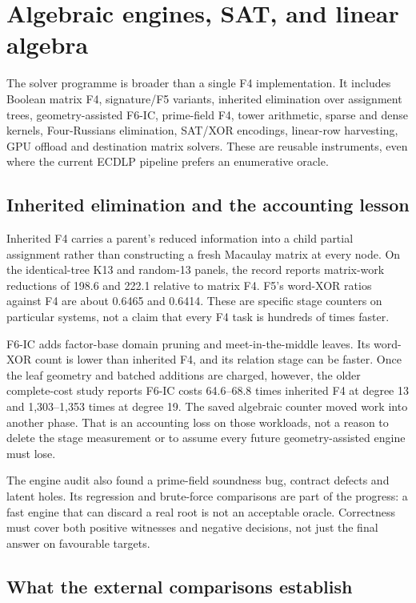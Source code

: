 \section{Algebraic engines, SAT, and linear algebra}\label{sec:solvers}

The solver programme is broader than a single F4 implementation. It
includes Boolean matrix F4, signature/F5 variants, inherited elimination
over assignment trees, geometry-assisted F6-IC, prime-field F4, tower
arithmetic, sparse and dense kernels, Four-Russians elimination, SAT/XOR
encodings, linear-row harvesting, GPU offload and destination matrix
solvers. These are reusable instruments, even where the current ECDLP
pipeline prefers an enumerative oracle.

\subsection{Inherited elimination and the accounting lesson}

Inherited F4 carries a parent's reduced information into a child partial
assignment rather than constructing a fresh Macaulay matrix at every
node. On the identical-tree K13 and random-13 panels, the record reports
matrix-work reductions of 198.6 and 222.1 relative to matrix F4. F5's
word-XOR ratios against F4 are about 0.6465 and 0.6414. These are
specific stage counters on particular systems, not a claim that every
F4 task is hundreds of times faster.

F6-IC adds factor-base domain pruning and meet-in-the-middle leaves.
Its word-XOR count is lower than inherited F4, and its relation stage can
be faster. Once the leaf geometry and batched additions are charged,
however, the older complete-cost study reports F6-IC costs 64.6--68.8
times inherited F4 at degree 13 and 1,303--1,353 times at degree 19.
The saved algebraic counter moved work into another phase. That is an
accounting loss on those workloads, not a reason to delete the stage
measurement or to assume every future geometry-assisted engine must
lose.

The engine audit also found a prime-field soundness bug, contract
defects and latent holes. Its regression and brute-force comparisons are
part of the progress: a fast engine that can discard a real root is not
an acceptable oracle. Correctness must cover both positive witnesses and
negative decisions, not just the final answer on favourable targets.

\subsection{What the external comparisons establish}

